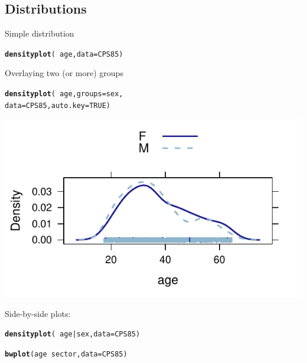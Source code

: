 \documentclass{report}\usepackage{graphicx, color}
\makeatletter
\newcommand{\hlfunctioncall}[1]{\textcolor[rgb]{0.501960784313725,0,0.329411764705882}{\textbf{#1}}}%
\newenvironment{kframe}{%
 \def\at@end@of@kframe{}%
 \ifinner\ifhmode%
  \def\at@end@of@kframe{\end{minipage}}%
  \begin{minipage}{\columnwidth}%
 \fi\fi%
 \def\FrameCommand##1{\hskip\@totalleftmargin \hskip-\fboxsep
 \colorbox{shadecolor}{##1}\hskip-\fboxsep
     \hskip-\linewidth \hskip-\@totalleftmargin \hskip\columnwidth}%
 \MakeFramed {\advance\hsize-\width
   \@totalleftmargin\z@ \linewidth\hsize
   \@setminipage}}%
 {\par\unskip\endMakeFramed%
 \at@end@of@kframe}
\newenvironment{knitrout}{}{} %
\makeatother
\begin{document}
\begin{multicols}{4}
\vfill
\columnbreak

\subsection*{Distributions}
Simple distribution
\begin{knitrout}
\color{fgcolor}\begin{kframe}
\begin{alltt}
\hlfunctioncall{densityplot}(~age, data = CPS85)
\end{alltt}
\end{kframe}
\end{knitrout}

Overlaying two (or more) groups
\begin{knitrout}
\color{fgcolor}\begin{kframe}
\begin{alltt}
\hlfunctioncall{densityplot}( ~ age, groups=sex, 
             data=CPS85, auto.key=TRUE)
\end{alltt}
\end{kframe}

{\centering \includegraphics[width=.25\textwidth]{figuresdensityplot2} 

}


\end{knitrout}

\vspace*{-.2in}
Side-by-side plots:
\begin{knitrout}
\color{fgcolor}\begin{kframe}
\begin{alltt}
\hlfunctioncall{densityplot}(~age | sex, data = CPS85)
\end{alltt}
\end{kframe}
\end{knitrout}

\vspace*{-.2in}
\begin{knitrout}
\color{fgcolor}\begin{kframe}
\begin{alltt}
\hlfunctioncall{bwplot}(age ~ sector, data = CPS85)
\end{alltt}
\end{kframe}
\end{knitrout}



\end{multicols}
\end{document}
